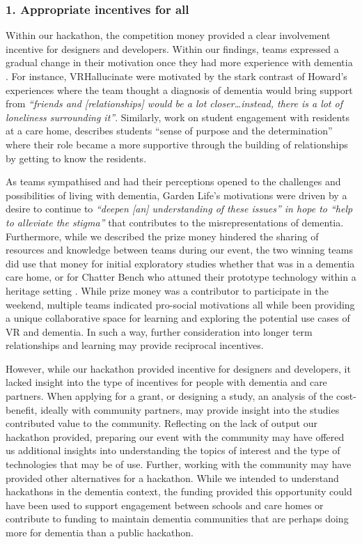 \subsubsection{1. Appropriate incentives for all}
\label{incentives}
Within our hackathon, the competition money provided a clear involvement incentive for designers and developers. Within our findings, teams expressed a gradual change in their motivation once they had more experience with dementia \citep{gama2017crowdsourced}. For instance, VRHallucinate were motivated by the stark contrast of Howard’s experiences where the team thought a diagnosis of dementia would bring support from \textit{“friends and [relationships] would be a lot closer…instead, there is a lot of loneliness surrounding it”}. Similarly, \citep{foley_student_2020} work on student engagement with residents at a care home, describes students “sense of purpose and the determination” where their role became a more supportive through the building of relationships by getting to know the residents.  

As teams sympathised and had their perceptions opened to the challenges and possibilities of living with dementia, Garden Life’s motivations were driven by a desire to continue to \textit{“deepen [an] understanding of these issues” in hope to “help to alleviate the stigma”} that contributes to the misrepresentations of dementia. Furthermore, while we described the prize money hindered the sharing of resources and knowledge between teams during our event, the two winning teams did use that money for initial exploratory studies whether that was in a dementia care home, or for Chatter Bench who attuned their prototype technology within a heritage setting \citep{tsenova2020authorised}. While prize money was a contributor to participate in the weekend, multiple teams indicated pro-social motivations all while been providing a unique collaborative space for learning and exploring the potential use cases of VR and dementia. In such a way, further consideration into longer term relationships and learning may provide reciprocal incentives.

However, while our hackathon provided incentive for designers and developers, it lacked insight into the type of incentives for people with dementia and care partners. When applying for a grant, or designing a study, an analysis of the cost-benefit, ideally with community partners, may provide insight into the studies contributed value to the community. Reflecting on the lack of output our hackathon provided, preparing our event with the community may have offered us additional insights into understanding the topics of interest and the type of technologies that may be of use. Further, working with the community may have provided other alternatives for a hackathon. While we intended to understand hackathons in the dementia context, the funding provided this opportunity could have been used to support engagement between schools and care homes or contribute to funding to maintain dementia communities that are perhaps doing more for dementia than a public hackathon. 

